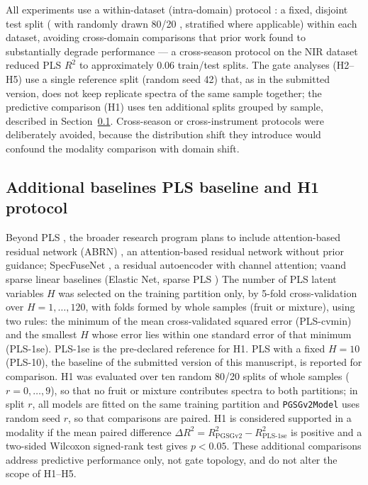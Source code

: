 \documentclass[preprint,12pt]{elsarticle}
\providecommand{\DIFaddtex}[1]{{\protect\color{blue} \sf #1}} %
\providecommand{\DIFdeltex}[1]{{\protect\color{red} \scriptsize #1}} %
\providecommand{\DIFaddbegin}{} %
\providecommand{\DIFaddend}{} %
\providecommand{\DIFdelbegin}{} %
\providecommand{\DIFdelend}{} %
\providecommand{\DIFadd}[1]{\texorpdfstring{\DIFaddtex{#1}}{#1}} %
\providecommand{\DIFdel}[1]{\texorpdfstring{\DIFdeltex{#1}}{}} %
\providecommand{\DIFscaledelfig}{0.5}
\newlength{\DIFdelgraphicswidth} %
\newlength{\DIFdelgraphicsheight} %
\providecommand{\DIFaddincludegraphics}[2][]{{\color{blue}\fbox{\DIFOincludegraphics[#1]{#2}}}} %
\providecommand{\DIFdelincludegraphics}[2][]{%
\sbox{\DIFdelgraphicsbox}{\DIFOincludegraphics[#1]{#2}}%
\settoboxwidth{\DIFdelgraphicswidth}{\DIFdelgraphicsbox} %
\settoboxtotalheight{\DIFdelgraphicsheight}{\DIFdelgraphicsbox} %
\scalebox{\DIFscaledelfig}{%
\parbox[b]{\DIFdelgraphicswidth}{\usebox{\DIFdelgraphicsbox}\\[-\baselineskip] \rule{\DIFdelgraphicswidth}{0em}}\llap{\resizebox{\DIFdelgraphicswidth}{\DIFdelgraphicsheight}{%
\setlength{\unitlength}{\DIFdelgraphicswidth}%
\begin{picture}(1,1)%
\thicklines\linethickness{2pt} %
{\color[rgb]{1,0,0}\put(0,0){\framebox(1,1){}}}%
{\color[rgb]{1,0,0}\put(0,0){\line( 1,1){1}}}%
{\color[rgb]{1,0,0}\put(0,1){\line(1,-1){1}}}%
\end{picture}%
}\hspace*{3pt}}} %
} %
\DeclareRobustCommand{\DIFaddbegin}{\DIFOaddbegin \let\includegraphics\DIFaddincludegraphics} %
\DeclareRobustCommand{\DIFaddend}{\DIFOaddend \let\includegraphics\DIFOincludegraphics} %
\DeclareRobustCommand{\DIFdelbegin}{\DIFOdelbegin \let\includegraphics\DIFdelincludegraphics} %
\DeclareRobustCommand{\DIFdelend}{\DIFOaddend \let\includegraphics\DIFOincludegraphics} %
\begin{document}
All experiments use a within-dataset (intra-domain) protocol \DIFdelbegin \DIFdel{: a fixed, disjoint test split (}\DIFdelend \DIFaddbegin \DIFadd{with randomly drawn }\DIFaddend 80/20 \DIFdelbegin \DIFdel{, stratified where applicable) within each dataset, avoiding cross-domain comparisons that prior work found to substantially degrade performance --- a cross-season protocol on the NIR dataset reduced PLS $R^{2}$ to approximately $0.06$ \cite{coelho_pgsg1}}\DIFdelend \DIFaddbegin \DIFadd{train/test splits. The gate analyses (H2--H5) use a single reference split (random seed 42) that, as in the submitted version, does not keep replicate spectra of the same sample together; the predictive comparison (H1) uses ten additional splits grouped by sample, described in Section~\ref{sec:pls}. Cross-season or cross-instrument protocols were deliberately avoided, because the distribution shift they introduce would confound the modality comparison with domain shift}\DIFaddend .


\subsection{\DIFdelbegin \DIFdel{Additional baselines}\DIFdelend \DIFaddbegin \DIFadd{PLS baseline and H1 protocol}\DIFaddend }
\DIFdelbegin %
\DIFdelend \DIFaddbegin \label{sec:pls}
\DIFaddend 

\DIFdelbegin \DIFdel{Beyond PLS , the broader research program plans to include attention-based residual network (ABRN) \cite{huang2019}, an attention-based residual network without prior guidance; SpecFuseNet \cite{kabiso2025}, a residual autoencoder with channel attention; vaand sparse linear baselines (Elastic Net, sparse PLS )}\DIFdelend \DIFaddbegin \DIFadd{The number of PLS latent variables $H$ was selected on the training partition only, by 5-fold cross-validation over $H=1,\dots,120$, with folds formed by whole samples (fruit or mixture), using two rules: the minimum of the mean cross-validated squared error (PLS-cvmin) and the smallest $H$ whose error lies within one standard error of that minimum (PLS-1se). PLS-1se is the pre-declared reference for H1. PLS with a fixed $H=10$ (PLS-10), the baseline of the submitted version of this manuscript, is reported for comparison. H1 was evaluated over ten random 80/20 splits of whole samples ($r=0,\dots,9$), so that no fruit or mixture contributes spectra to both partitions; in split $r$, all models are fitted on the same training partition and \texttt{PGSGv2Model} uses random seed $r$, so that comparisons are paired. H1 is considered supported in a modality if the mean paired difference $\Delta R^{2}=R^{2}_{\mathrm{PGSGv2}}-R^{2}_{\mathrm{PLS\text{-}1se}}$ is positive and a two-sided Wilcoxon signed-rank test gives $p<0.05$}\DIFaddend .
\DIFdelbegin \DIFdel{These additional comparisons address predictive performance only, not gate topology, and do not alter the scope of H1--H5.
}\DIFdelend 
\end{document}
